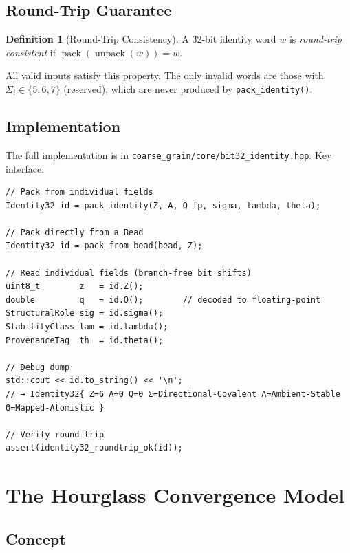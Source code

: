 \documentclass[11pt, a4paper, oneside]{article}
\theoremstyle{definition}
\newtheorem{definition}{Definition}[section]
\newcommand{\file}[1]{\texttt{#1}}
\begin{document}
\subsection{Round-Trip Guarantee}

\begin{definition}[Round-Trip Consistency]
  A 32-bit identity word $w$ is \emph{round-trip consistent} if
  $\operatorname{pack}(\operatorname{unpack}(w)) = w$.
\end{definition}

All valid inputs satisfy this property.  The only invalid words are
those with $\Sigma_i \in \{5,6,7\}$ (reserved), which are never
produced by \texttt{pack\_identity()}.

\subsection{Implementation}

The full implementation is in
\file{coarse\_grain/core/bit32\_identity.hpp}.
Key interface:

\begin{lstlisting}
// Pack from individual fields
Identity32 id = pack_identity(Z, A, Q_fp, sigma, lambda, theta);

// Pack directly from a Bead
Identity32 id = pack_from_bead(bead, Z);

// Read individual fields (branch-free bit shifts)
uint8_t        z   = id.Z();
double         q   = id.Q();        // decoded to floating-point
StructuralRole sig = id.sigma();
StabilityClass lam = id.lambda();
ProvenanceTag  th  = id.theta();

// Debug dump
std::cout << id.to_string() << '\n';
// → Identity32{ Z=6 A=0 Q=0 Σ=Directional-Covalent Λ=Ambient-Stable Θ=Mapped-Atomistic }

// Verify round-trip
assert(identity32_roundtrip_ok(id));
\end{lstlisting}

\section{The Hourglass Convergence Model}
\label{sec:hourglass}

\subsection{Concept}
\end{document}
